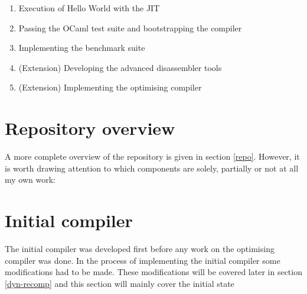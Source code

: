 \begin{enumerate}
      \item Execution of Hello World with the JIT
      \item Passing the OCaml test suite and bootstrapping the compiler
      \item Implementing the benchmark suite
      \item (Extension) Developing the advanced disassembler tools
      \item (Extension) Implementing the optimising compiler
\end{enumerate}

\section{Repository overview}

A more complete overview of the repository is given in section \ref{repo}. However, it is worth
drawing attention to which components are solely, partially or not at all my own work:


\section{Initial compiler}

The initial compiler was developed first before any work on the optimising compiler was done. In
the process of implementing the
initial compiler some modifications had to be made. These modifications will be covered later in
section \ref{dyn-recomp} and this section will mainly cover the initial state

